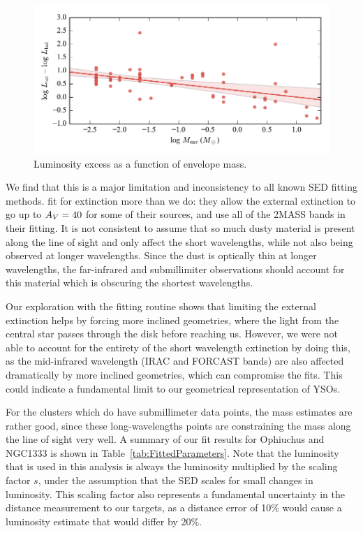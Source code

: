\begin{figure}[!h]
\begin{center}
\includegraphics[width=\textwidth]{Figures/LbolMinusLestVSMass.pdf}
\vspace{-1cm}
\caption[Luminosity excess as a function of envelope mass]{Luminosity excess as a function of envelope mass.}
\label{fig:LbolMinusLestVSMass}
\end{center}
\end{figure}




We find that this is a major limitation and inconsistency to all known SED fitting methods. \citet{Furlan:2016df} fit for extinction more than we do: they allow the external extinction to go up to $A_V = 40$ for some of their sources, and use all of the 2MASS bands in their fitting. It is not consistent to assume that so much dusty material is present along the line of sight and only affect the short wavelengths, while not also being observed at longer wavelengths. Since the dust is optically thin at longer wavelengths, the far-infrared and submillimiter observations should account for this material which is obscuring the shortest wavelengths.

Our exploration with the fitting routine shows that limiting the external extinction helps by forcing more inclined geometries, where the light from the central star passes through the disk before reaching us. However, we were not able to account for the entirety of the short wavelength extinction by doing this, as the mid-infrared wavelength (IRAC and FORCAST bands) are also affected dramatically by more inclined geometries, which can compromise the fits. This could indicate a fundamental limit to our geometrical representation of YSOs.

For the clusters which do have submillimeter data points, the mass estimates are rather good, since these long-wavelengths points are constraining the mass along the line of sight very well. A summary of our fit results for Ophiuchus and NGC1333 is shown in Table~\ref{tab:FittedParameters}. Note that the luminosity that is used in this analysis is always the luminosity multiplied by the scaling factor $s$, under the assumption that the SED scales for small changes in luminosity. This scaling factor also represents a fundamental uncertainty in the distance measurement to our targets, as a distance error of 10\% would cause a luminosity estimate that would differ by 20\%.

